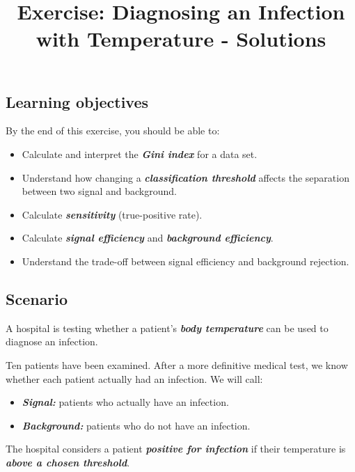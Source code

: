 \documentclass[10pt]{article}
\begin{document}
\title{Exercise: Diagnosing an Infection with Temperature - Solutions}
\author{}
\date{}
\maketitle
\subsection*{Learning objectives}
By the end of this exercise, you should be able to:

\begin{itemize}
\item
Calculate and interpret the \textbf{\textit{Gini index}} for a data set.

\item
Understand how changing a \textbf{\textit{classification threshold}} affects the separation between two signal and background.

\item
Calculate \textbf{\textit{sensitivity}} (true-positive rate).

\item
Calculate \textbf{\textit{signal efficiency}} and \textbf{\textit{background efficiency}}.

\item
Understand the trade-off between signal efficiency and background rejection.

\end{itemize}
\subsection*{Scenario}
A hospital is testing whether a patient's \textbf{\textit{body temperature}} can be used to diagnose an infection.

Ten patients have been examined. After a more definitive medical test, we know whether each patient actually had an infection. We will call:

\begin{itemize}
\item
\textbf{\textit{Signal:}} patients who actually have an infection.

\item
\textbf{\textit{Background:}} patients who do not have an infection.

\end{itemize}
The hospital considers a patient \textbf{\textit{positive for infection}} if their temperature is \textbf{\textit{above a chosen threshold}}.
\end{document}
